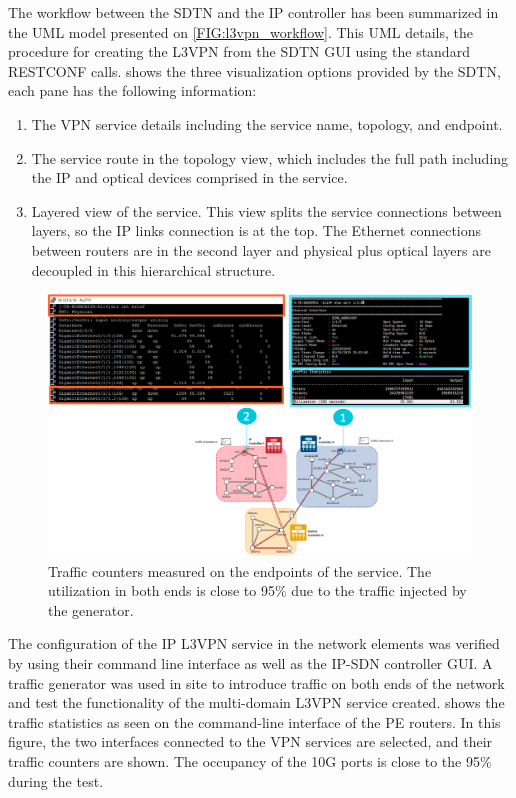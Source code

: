 \documentclass[a4paper,fleqn]{cas-dc}
\begin{document}
The workflow between the SDTN and the IP controller has been summarized in the UML model presented on \cref{FIG:l3vpn_workflow}. This UML details, the procedure for creating the L3VPN from the SDTN GUI using the standard RESTCONF calls. 
 shows the three visualization options provided by the SDTN, each pane has the following information:
\begin{enumerate}
    \item The VPN service details including the service name, topology, and endpoint.
    \item The service route in the topology view, which includes the full path including the IP and optical devices comprised in the service.
    \item Layered view of the service. This view splits the service connections between layers, so the IP links connection is at the top. The Ethernet connections between routers are in the second layer and physical plus optical layers are decoupled in this hierarchical structure.
\end{enumerate}

\begin{figure}
	\centering
		\includegraphics[width=\linewidth]{figs/counters.png}
	\caption{Traffic counters measured on the endpoints of the service. The utilization in both ends is close to 95\% due to the traffic injected by the generator.}
	\label{FIG:counters}
\end{figure}

The configuration of the IP L3VPN service in the network elements was verified by using their command line interface as well as the IP-SDN controller GUI. A traffic generator was used in site to introduce traffic on both ends of the network and test the functionality of the multi-domain L3VPN service created.  shows the traffic statistics as seen on the command-line interface of the PE routers. In this figure, the two interfaces connected to the VPN services are selected, and their traffic counters are shown. The occupancy of the 10G ports is close to the 95\% during the test. 
\end{document}
